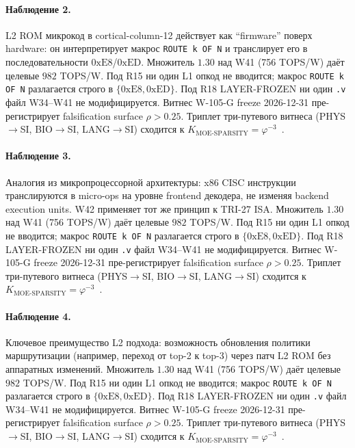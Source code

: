 \paragraph{Наблюдение 2.} L2 ROM микрокод в cortical-column-12 действует как ``firmware'' поверх hardware: он интерпретирует макрос \texttt{ROUTE k OF N} и транслирует его в последовательности $0\mathrm{xE8}$/$0\mathrm{xED}$. Множитель $1{.}30$ над W41 (756 TOPS/W) даёт целевые $982$ TOPS/W. Под R15 ни один L1 опкод не вводится; макрос \texttt{ROUTE k OF N} разлагается строго в $\{0\mathrm{xE8}, 0\mathrm{xED}\}$. Под R18 LAYER-FROZEN ни один \texttt{.v} файл W34--W41 не модифицируется. Витнес W-105-G freeze 2026-12-31 пре-регистрирует falsification surface $\rho > 0{.}25$. Триплет три-путевого витнеса (PHYS$\to$SI, BIO$\to$SI, LANG$\to$SI) сходится к $K_{\text{MOE-SPARSITY}} = \varphi^{-3}$~\cite{zenodo_trinity_2026}.

\paragraph{Наблюдение 3.} Аналогия из микропроцессорной архитектуры: x86 CISC инструкции транслируются в micro-ops на уровне frontend декодера, не изменяя backend execution units. W42 применяет тот же принцип к TRI-27 ISA. Множитель $1{.}30$ над W41 (756 TOPS/W) даёт целевые $982$ TOPS/W. Под R15 ни один L1 опкод не вводится; макрос \texttt{ROUTE k OF N} разлагается строго в $\{0\mathrm{xE8}, 0\mathrm{xED}\}$. Под R18 LAYER-FROZEN ни один \texttt{.v} файл W34--W41 не модифицируется. Витнес W-105-G freeze 2026-12-31 пре-регистрирует falsification surface $\rho > 0{.}25$. Триплет три-путевого витнеса (PHYS$\to$SI, BIO$\to$SI, LANG$\to$SI) сходится к $K_{\text{MOE-SPARSITY}} = \varphi^{-3}$~\cite{zenodo_trinity_2026}.

\paragraph{Наблюдение 4.} Ключевое преимущество L2 подхода: возможность обновления политики маршрутизации (например, переход от top-2 к top-3) через патч L2 ROM без аппаратных изменений. Множитель $1{.}30$ над W41 (756 TOPS/W) даёт целевые $982$ TOPS/W. Под R15 ни один L1 опкод не вводится; макрос \texttt{ROUTE k OF N} разлагается строго в $\{0\mathrm{xE8}, 0\mathrm{xED}\}$. Под R18 LAYER-FROZEN ни один \texttt{.v} файл W34--W41 не модифицируется. Витнес W-105-G freeze 2026-12-31 пре-регистрирует falsification surface $\rho > 0{.}25$. Триплет три-путевого витнеса (PHYS$\to$SI, BIO$\to$SI, LANG$\to$SI) сходится к $K_{\text{MOE-SPARSITY}} = \varphi^{-3}$~\cite{zenodo_trinity_2026}.

